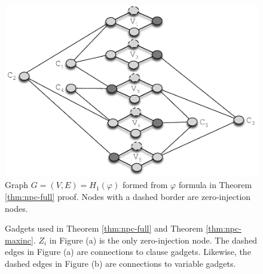 \begin{figure}[t]
\centering
\includegraphics[scale=0.53]{figs/proof1-inject-example.pdf}
\caption{Graph $G=(V,E)=H_1(\varphi)$ formed from $\varphi$ formula in Theorem \ref{thm:npc-full} proof. Nodes with a dashed border are zero-injection nodes.}
\label{fig:proof1-inject-example}
\end{figure}

\begin{figure}[t]
	\caption{Gadgets used in Theorem \ref{thm:npc-full} and Theorem \ref{thm:npc-maxinc}. $Z_i$ in Figure (a) is the only zero-injection node. The dashed edges in Figure (a) are connections to clause gadgets.  Likewise, the dashed edges in Figure (b) are connections to variable gadgets. }
  \label{fig:pmu-gadgets}
\end{figure}




